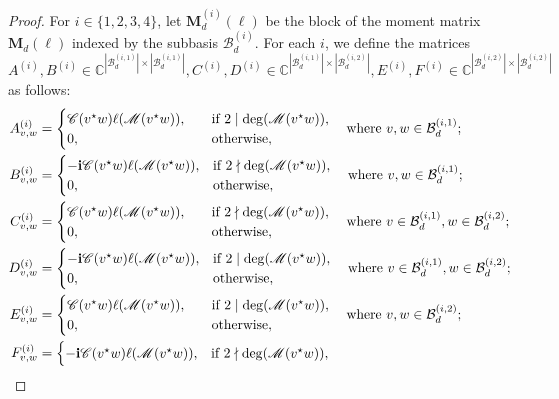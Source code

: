 \documentclass[10pt,a4paper]{amsart}
\def\C{{\mathbb{C}}}
\def\MM{{\mathbf{M}}}
\def\bi{\hbox{\bf{i}}}
\def\cB{{\mathcal{B}}}
\def\sC{{\mathscr{C}}}
\def\sM{{\mathscr{M}}}
\theoremstyle{plain}
\theoremstyle{definition}
\theoremstyle{remark}
\begin{document}
\begin{proof}
For $i\in\{1,2,3,4\}$, let $\MM_{d}^{(i)}(\ell)$ be the block of the moment matrix $\MM_{d}(\ell)$ indexed by the subbasis $\cB_d^{(i)}$. For each $i$, we define the matrices $A^{(i)},B^{(i)}\in\C^{|\cB_d^{(i,1)}|\times|\cB_d^{(i,1)}|},C^{(i)},D^{(i)}\in\C^{|\cB_d^{(i,1)}|\times|\cB_d^{(i,2)}|},E^{(i)},F^{(i)}\in\C^{|\cB_d^{(i,2)}|\times|\cB_d^{(i,2)}|}$ as follows:
\begin{subequations}\label{sec:eq2}
\begin{align}
    A^{(i)}_{v,w}&=\begin{cases}
    \sC(v^{\star}w)\ell(\sM(v^{\star}w)), \quad&\text{if }2\mid\deg(\sM(v^{\star}w)),\\
    0, \quad&\text{otherwise},
    \end{cases}\quad \text{where } v,w\in\cB_d^{(i,1)};\\
    B^{(i)}_{v,w}&=\begin{cases}
    -\bi\sC(v^{\star}w)\ell(\sM(v^{\star}w)), &\text{if }2\nmid\deg(\sM(v^{\star}w)),\\
    0, &\text{otherwise},
    \end{cases}\quad \text{where } v,w\in\cB_d^{(i,1)};\\
    C^{(i)}_{v,w}&=\begin{cases}
    \sC(v^{\star}w)\ell(\sM(v^{\star}w)), \quad&\text{if }2\nmid\deg(\sM(v^{\star}w)),\\
    0, \quad&\text{otherwise},
    \end{cases}\quad \text{where } v\in\cB_d^{(i,1)},w\in\cB_d^{(i,2)};\\
    D^{(i)}_{v,w}&=\begin{cases}
    -\bi\sC(v^{\star}w)\ell(\sM(v^{\star}w)), &\text{if }2\mid\deg(\sM(v^{\star}w)),\\
    0, &\text{otherwise},
    \end{cases}\quad \text{where } v\in\cB_d^{(i,1)},w\in\cB_d^{(i,2)};\\
    E^{(i)}_{v,w}&=\begin{cases}
    \sC(v^{\star}w)\ell(\sM(v^{\star}w)), \quad&\text{if }2\mid\deg(\sM(v^{\star}w)),\\
    0, \quad&\text{otherwise},\end{cases}\quad \text{where } v,w\in\cB_d^{(i,2)};
    \\
    F^{(i)}_{v,w}&=\begin{cases}
    -\bi\sC(v^{\star}w)\ell(\sM(v^{\star}w)), &\text{if }2\nmid\deg(\sM(v^{\star}w)),\\

\end{cases}
\end{align}
\end{subequations}
\end{proof}
\end{document}
